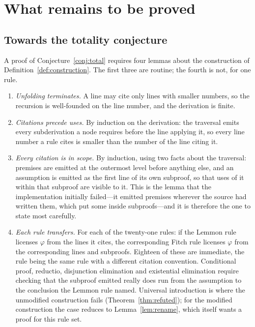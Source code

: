 \documentclass[11pt]{article}
\theoremstyle{plain}
\theoremstyle{definition}
\theoremstyle{remark}
\begin{document}
\section{What remains to be proved}\label{sec:open}

\subsection{Towards the totality conjecture}

A proof of Conjecture~\ref{conj:total} requires four lemmas about the
construction of Definition~\ref{def:construction}. The first three are
routine; the fourth is not, for one rule.

\begin{enumerate}
\item[(L1)] \emph{Unfolding terminates.} A line may cite only lines with
smaller numbers, so the recursion is well-founded on the line number, and the
derivation is finite.

\item[(L2)] \emph{Citations precede uses.} By induction on the derivation:
the traversal emits every subderivation a node requires before the line
applying it, so every line number a rule cites is smaller than the number of
the line citing it.

\item[(L3)] \emph{Every citation is in scope.} By induction, using two facts
about the traversal: premises are emitted at the outermost level before
anything else, and an assumption is emitted as the first line of its own
subproof, so that uses of it within that subproof are visible to it. This is
the lemma that the implementation initially failed---it emitted premises
wherever the source had written them, which put some inside subproofs---and it
is therefore the one to state most carefully.

\item[(L4)] \emph{Each rule transfers.} For each of the twenty-one rules: if
the Lemmon rule licenses $\varphi$ from the lines it cites, the corresponding
Fitch rule licenses $\varphi$ from the corresponding lines and subproofs.
Eighteen of these are immediate, the rule being the same rule with a different
citation convention. Conditional proof, reductio, disjunction elimination and
existential elimination require checking that the subproof emitted really does
run from the assumption to the conclusion the Lemmon rule named. Universal
introduction is where the unmodified construction fails
(Theorem~\ref{thm:refuted}); for the modified construction the case reduces to
Lemma~\ref{lem:rename}, which itself wants a proof for this rule set.
\end{enumerate}
\end{document}
